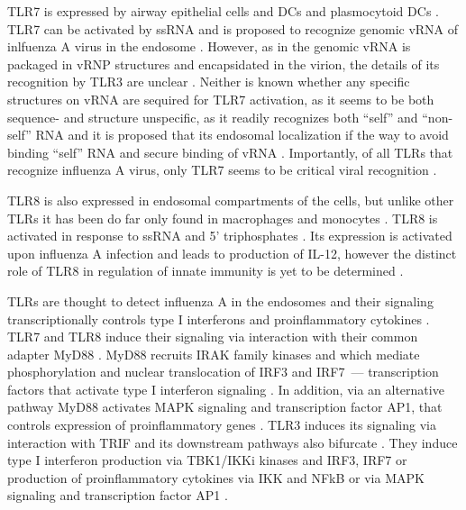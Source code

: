 		\gls{TLR}7 is expressed by airway epithelial cells and \gls{DC}s and plasmocytoid \gls{DC}s \parencite{Ioannidis2013, Lund2004}. \gls{TLR}7 can be activated by ssRNA and is proposed to recognize genomic vRNA of inlfuenza A virus in the endosome \parencite{Diebold2004}. However, as in the genomic vRNA is packaged in \gls{vRNP} structures and encapsidated in the virion, the details of its recognition by \gls{TLR}3 are unclear \parencite{Diebold2004}. Neither is known whether any specific structures on vRNA are sequired for \gls{TLR}7 activation, as it seems to be both sequence- and structure unspecific, as it readily recognizes both ``self'' and ``non-self'' RNA and it is proposed that its endosomal localization if the way to avoid binding ``self'' RNA and secure binding of vRNA \parencite{Diebold2004}. Importantly, of all \gls{TLR}s that recognize influenza A virus, only \gls{TLR}7 seems to be critical viral recognition \parencite{Lund2004}.
			
		
		\gls{TLR}8 is also expressed in endosomal compartments of the cells, but unlike other \gls{TLR}s it has been do far only found in macrophages and monocytes \parencite{Ablasser2009}. \gls{TLR}8 is activated in response to ssRNA and 5' triphosphates \parencite{Ablasser2009}. Its expression is activated upon influenza A infection and leads to production of \gls{IL}-12, however the distinct role of \gls{TLR}8 in regulation of innate immunity is yet to be determined \parencite{Lee2013a}.
		
		\gls{TLR}s are thought to detect influenza A in the endosomes and their signaling transcriptionally controls type I interferons and proinflammatory cytokines \parencite{Kawai2007}. TLR7 and TLR8 induce their signaling via interaction with their common adapter MyD88 \parencite{Medzhitov1998}. MyD88 recruits IRAK family kinases and which mediate phosphorylation and nuclear translocation of \gls{IRF}3 and \gls{IRF}7~--- transcription factors that activate type I interferon signaling \parencite{Burns2003, Honda2005a}. In addition, via an alternative pathway MyD88 activates \gls{MAPK} signaling and transcription factor \gls{AP1}, that controls expression of proinflammatory genes \parencite{Kawai2007}. TLR3 induces its signaling via interaction with \gls{TRIF} and its downstream pathways also bifurcate \parencite{Guillot2005, Kumar2009}.	They induce type I interferon production via TBK1/IKKi kinases and \gls{IRF}3, \gls{IRF}7 or production of proinflammatory cytokines via \gls{IKK} and \gls{NFkB} or via \gls{MAPK} signaling and transcription factor \gls{AP1} \parencite{Guillot2005, Vercammen2008}.  
		 
